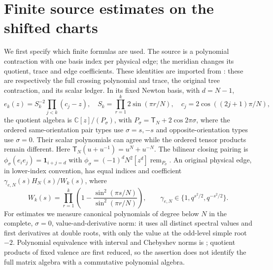 \section{Finite source estimates on the shifted charts}\label{me:analytic}
We first specify which finite formulas are used. The source is a
polynomial contraction with one basis index per physical edge; the
meridian changes its quotient, trace and edge coefficients. These
identities are imported from
\cite[Proposition 6.1, Theorem 7.1 and Proposition 8.1]{Meridian}:
these are respectively the full crossing polynomial and trace,
the original tree contraction, and its scalar ledger. In its fixed
Newton basis, with $d=N-1$,
\[
 e_k(z)=S_k^{-2}\prod_{j<k}(c_j-z),\quad
 S_k=\prod_{r=1}^k2\sin(\pi r/N),\quad
 c_j=2\cos((2j+1)\pi/N),
\]
the quotient algebra is $\mathbb C[z]/(P_\sigma)$, with
$P_\sigma=\mathsf T_N+2\cos2\pi\sigma$,
where the ordered same-orientation pair types use $\sigma=s,-s$
and opposite-orientation types use $\sigma=0$. Their scalar
polynomials can agree while the ordered tensor products remain
different. Here
$\mathsf T_N(u+u^{-1})=u^N+u^{-N}$. The bilinear closing pairing is
$\phi_\sigma(e_i e_j)=\mathbf1_{i+j=d}$ with
$\phi_\sigma=(-1)^dN^2[z^d]\operatorname{rem}_{P_\sigma}$.
An original physical edge, in lower-index convention, has equal
indices and coefficient $\gamma_{e,N}(s)H_N(s)/W_k(s)$, where
\begin{equation}\label{me:W}
 W_k(s)=\prod_{r=1}^k
       \left(1-\frac{\sin^2(\pi s/N)}{\sin^2(\pi r/N)}\right),
 \qquad\gamma_{e,N}\in\{1,q^{s^2/2},q^{-s^2/2}\}.
\end{equation}
For estimates we measure canonical polynomials of degree below $N$
in the complete, $\sigma=0$, value-and-derivative norm: it uses all
distinct spectral values and first derivatives at double roots, with
only the value at the odd-level simple root $-2$.
Polynomial equivalence with interval and Chebyshev norms is
\cite[Lemma 2.1]{Bounds}; quotient products of fixed valence are
first reduced, so the assertion does not identify the full matrix
algebra with a commutative polynomial algebra.

